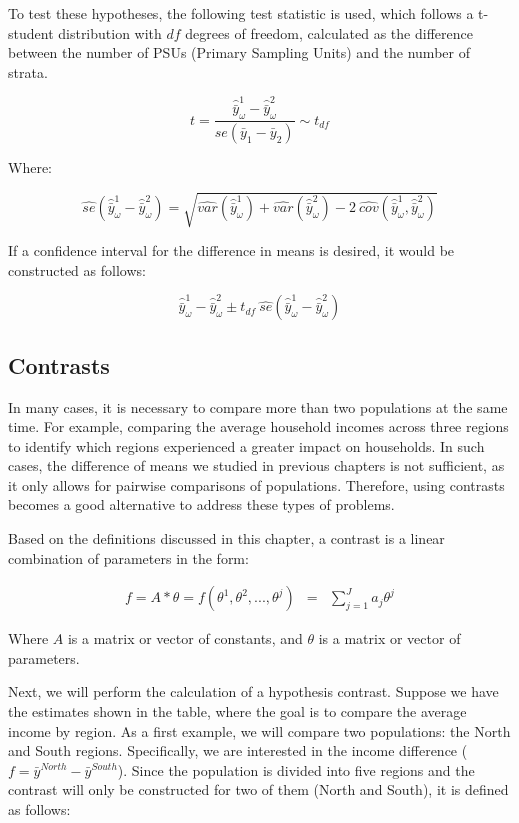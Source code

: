 \documentclass[
  12pt,
]{book}
\begin{document}
To test these hypotheses, the following test statistic is used, which follows a t-student distribution with \(df\) degrees of freedom, calculated as the difference between the number of PSUs (Primary Sampling Units) and the number of strata.

\[
t = \frac{\hat{\bar{y}}_{\omega}^{1}-\hat{\bar{y}}_{\omega}^{2}}{se\left(\bar{y}_{1}-\bar{y}_{2}\right)} \sim t_{df}
\]

Where:

\[
\widehat{se}\left(\hat{\bar{y}}_{\omega}^{1}-\hat{\bar{y}}_{\omega}^{2}\right) = \sqrt{\widehat{var}\left(\hat{\bar{y}}_{\omega}^{1}\right) + \widehat{var}\left(\hat{\bar{y}}_{\omega}^{2}\right) - 2 \  \widehat{cov}\left(\hat{\bar{y}}_{\omega}^{1},\hat{\bar{y}}_{\omega}^{2}\right)}
\]

If a confidence interval for the difference in means is desired, it would be constructed as follows:

\[
\hat{\bar{y}}_{\omega}^{1}-\hat{\bar{y}}_{\omega}^{2} \pm t_{df}\ \widehat{se}\left(\hat{\bar{y}}_{\omega}^{1}-\hat{\bar{y}}_{\omega}^{2}\right)
\]

\subsection{Contrasts}\label{contrasts}

In many cases, it is necessary to compare more than two populations at the same time. For example, comparing the average household incomes across three regions to identify which regions experienced a greater impact on households. In such cases, the difference of means we studied in previous chapters is not sufficient, as it only allows for pairwise comparisons of populations. Therefore, using contrasts becomes a good alternative to address these types of problems.

Based on the definitions discussed in this chapter, a contrast is a linear combination of parameters in the form:

\begin{eqnarray*}
f = A * \theta = f\left(\theta^{1},\theta^{2},...,\theta^{j}\right) & = & \sum_{j=1}^{J}a_{j}\theta^{j}
\end{eqnarray*}

Where \(A\) is a matrix or vector of constants, and \(\theta\) is a matrix or vector of parameters.

Next, we will perform the calculation of a hypothesis contrast. Suppose we have the estimates shown in the table, where the goal is to compare the average income by region. As a first example, we will compare two populations: the North and South regions. Specifically, we are interested in the income difference (\(f = \bar{y}^{North} - \bar{y}^{South}\)). Since the population is divided into five regions and the contrast will only be constructed for two of them (North and South), it is defined as follows:
\end{document}
